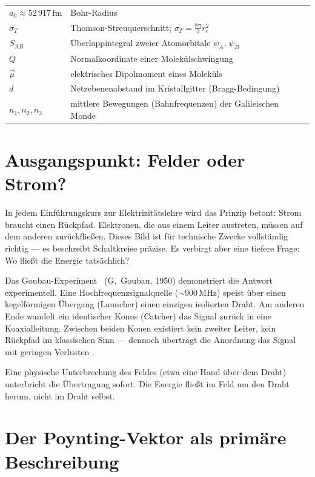 \begin{longtable}{@{}lp{7cm}@{}}
$a_0 \approx 52\,917\,\mathrm{fm}$ & Bohr-Radius \\
$\sigma_T$ & Thomson-Streuquerschnitt; $\sigma_T = \tfrac{8\pi}{3}r_e^2$ \\
$S_{AB}$ & Überlappintegral zweier Atomorbitale $\psi_A$, $\psi_B$ \\
$Q$ & Normalkoordinate einer Molekülschwingung \\
$\vec{\mu}$ & elektrisches Dipolmoment eines Moleküls \\
$d$ & Netzebenenabstand im Kristallgitter (Bragg-Bedingung) \\
$n_1, n_2, n_3$ & mittlere Bewegungen (Bahnfrequenzen) der Galileischen Monde \\
\bottomrule
\end{longtable}

\section{Ausgangspunkt: Felder oder Strom?}

In jedem Einführungskurs zur Elektrizitätslehre wird das Prinzip betont:
Strom braucht einen Rückpfad. Elektronen, die aus einem Leiter austreten,
müssen auf dem anderen zurückfließen. Dieses Bild ist für technische Zwecke
vollständig richtig --- es beschreibt Schaltkreise präzise. Es verbirgt aber
eine tiefere Frage: Wo fließt die Energie tatsächlich?

Das Goubau-Experiment \QM\ (G.~Goubau, 1950) demonstriert die Antwort
experimentell. Eine Hoch\-fre\-quenz\-si\-gnal\-quel\-le (${\sim}900\,\mathrm{MHz}$)
speist über einen kegelförmigen Übergang (Launcher) einen einzigen
isolierten Draht. Am anderen Ende wandelt ein identischer Konus (Catcher)
das Signal zurück in eine Koaxialleitung. Zwischen beiden Konen existiert
kein zweiter Leiter, kein Rückpfad im klassischen Sinn --- dennoch überträgt
die Anordnung das Signal mit geringen Verlusten \cite{Goubau1950}.

Eine physische Unterbrechung des Feldes (etwa eine Hand über dem Draht)
unterbricht die Übertragung sofort. Die Energie fließt im Feld um den Draht
herum, nicht im Draht selbst.

\section{Der Poynting-Vektor als primäre Beschreibung}

